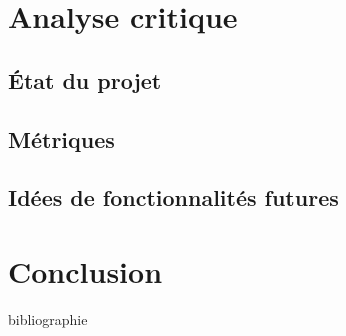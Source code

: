 \chapter{Analyse critique}
\section{État du projet}
\section{Métriques} 
\section{Idées de fonctionnalités futures}

\chapter{Conclusion}

\backmatter

{bibliographie}

